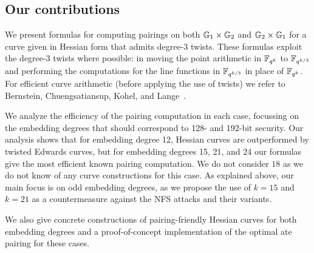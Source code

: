 


\subsection{Our contributions}

We present formulas for computing pairings on both $\mathbb{G}_{1} \times \mathbb{G}_{2}$ and $\mathbb{G}_{2} \times \mathbb{G}_{1}$ for a curve given in Hessian form that admits degree-3 twists.
These formulas exploit the degree-3 twists where possible: in moving the point arithmetic in $\mathbb{F}_{q^k}$ to $\mathbb{F}_{q^{k/3}}$ and performing the computations for the line functions in $\mathbb{F}_{q^{k/3}}$ in place of $\mathbb{F}_{q^k}$.
For efficient curve arithmetic (before applying the use of twists) we refer to
Bernstein, Chuengsatiansup, Kohel, and Lange~\cite{2015/hessian}.

We analyze the efficiency of the pairing computation in each case, focussing on the embedding degrees that should correspond to 128- and 192-bit security. 
Our analysis shows that for embedding degree 12, Hessian curves are outperformed by twisted Edwards curves, but for embedding degrees 15, 21, and 24
our formulas give the most efficient known pairing computation.
We do not consider $18$ as we do not know of any curve constructions for this case.
As explained above, our main focus is on odd embedding degrees, as we propose 
the use of $k=15$ and $k=21$ as a countermeasure against the NFS attacks and their variants.

We also give concrete constructions of pairing-friendly Hessian curves for both embedding degrees and a proof-of-concept implementation of the optimal ate pairing for these cases. 

